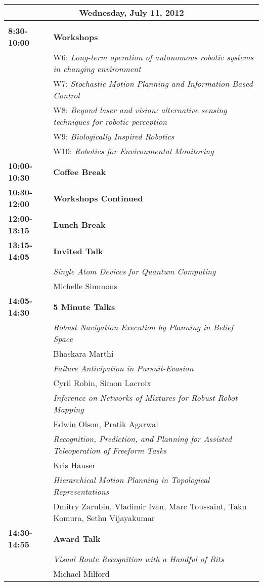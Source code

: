 \newpage
\begin{tabular}{lp{13.8cm}}
\hline
\multicolumn{2}{|c|}{{\bf Wednesday, July 11, 2012}}\\
\hline\\
{\bf 8:30-10:00} & {\bf Workshops} \\[2mm]
& W6: {\em Long-term operation of autonomous robotic systems in changing environment}\\
& W7: {\em Stochastic Motion Planning and Information-Based Control}\\
& W8: {\em Beyond laser and vision: alternative sensing techniques for robotic perception}\\
& W9: {\em Biologically Inspired Robotics}\\
& W10: {\em  Robotics for Environmental Monitoring}\\[2mm]


{\bf 10:00-10:30} & {\bf Coffee Break} \\[4mm]

{\bf 10:30-12:00} & {\bf Workshops Continued} \\[4mm]

{\bf 12:00-13:15} & {\bf Lunch Break} \\[4mm]

{\bf 13:15-14:05} & {\bf Invited Talk} \\[2mm]
& \em{ Single Atom Devices for Quantum Computing}\\
& Michelle Simmons\\[2mm]

{\bf 14:05-14:30} & {\bf 5 Minute Talks} \\[2mm]
& \em{ Robust Navigation Execution by Planning in Belief Space}\\
& Bhaskara Marthi\label{Marthi}\\[2mm]
& \em{ Failure Anticipation in Pursuit-Evasion}\\
& Cyril Robin\label{Robin}, Simon Lacroix\\[2mm]
& \em{ Inference on Networks of Mixtures for Robust Robot Mapping}\\
& Edwin Olson\label{Olson}, Pratik Agarwal\\[2mm]
& \em{ Recognition, Prediction, and Planning for Assisted Teleoperation of Freeform Tasks}\\
& Kris Hauser\label{Hauser}\\[2mm]
& \em{ Hierarchical Motion Planning in Topological Representations}\\
& Dmitry Zarubin\label{Zarubin}, Vladimir Ivan, Marc Toussaint, Taku Komura, Sethu Vijayakumar\\[2mm]

{\bf 14:30-14:55} & {\bf Award Talk} \\[2mm]
& \em{ Visual Route Recognition with a Handful of Bits}\\
& Michael Milford\label{Milford}\\[2mm]
\end{tabular}

